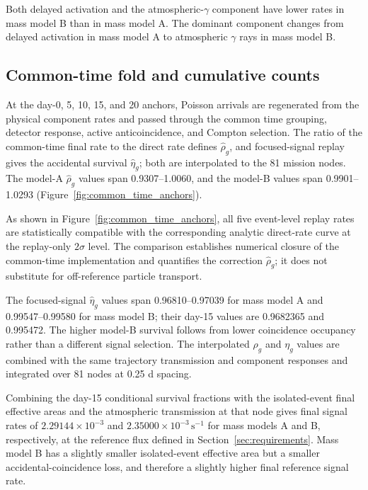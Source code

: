\documentclass[11pt]{article}
\newcommand{\revblue}[1]{\textcolor{revisionblue}{#1}}
\newcommand{\cps}{\ensuremath{\,\mathrm{s^{-1}}}}
\begin{document}
Both delayed activation and the \revblue{atmospheric-$\gamma$ component} have
lower rates in mass model B than in mass model A. The dominant component
changes from delayed activation in mass model A to \revblue{atmospheric
$\gamma$ rays} in mass model B.

\FloatBarrier

\subsection{Common-time fold and cumulative counts}
\label{subsec:mission_fold_validation}

At the day-0, 5, 10, 15, and 20 anchors, Poisson arrivals are regenerated from the physical component rates and passed through the common time grouping, detector response, active anticoincidence, and Compton selection. The ratio of the common-time final rate to the direct rate defines $\widehat\rho_g$, and focused-signal replay gives the accidental survival $\widehat\eta_g$; both are interpolated to the 81 mission nodes. The model-A $\widehat\rho_g$ values span 0.9307--1.0060, and the model-B values span 0.9901--1.0293 (Figure~\ref{fig:common_time_anchors}).

As shown in Figure~\ref{fig:common_time_anchors}, all five event-level replay
rates are statistically compatible with the corresponding analytic direct-rate
curve at the replay-only $2\sigma$ level. The comparison establishes numerical
closure of the common-time implementation and quantifies the correction
$\widehat\rho_g$; it does not substitute for off-reference particle transport.

The focused-signal $\widehat\eta_g$ values span 0.96810--0.97039 for mass model A and 0.99547--0.99580 for mass model B; their day-15 values are 0.9682365 and 0.995472. The higher model-B survival follows from lower coincidence occupancy rather than a different signal selection. The interpolated $\rho_g$ and $\eta_g$ values are combined with the same trajectory transmission and component responses and integrated over 81 nodes at 0.25 d spacing.

\revblue{Combining the day-15 conditional survival fractions with the isolated-event final effective areas and the atmospheric transmission at that node gives final signal rates of $2.29144\times10^{-3}$ and $2.35000\times10^{-3}\cps$ for mass models A and B, respectively, at the reference flux defined in Section~\ref{sec:requirements}. Mass model B has a slightly smaller isolated-event effective area but a smaller accidental-coincidence loss, and therefore a slightly higher final reference signal rate.}
\end{document}
